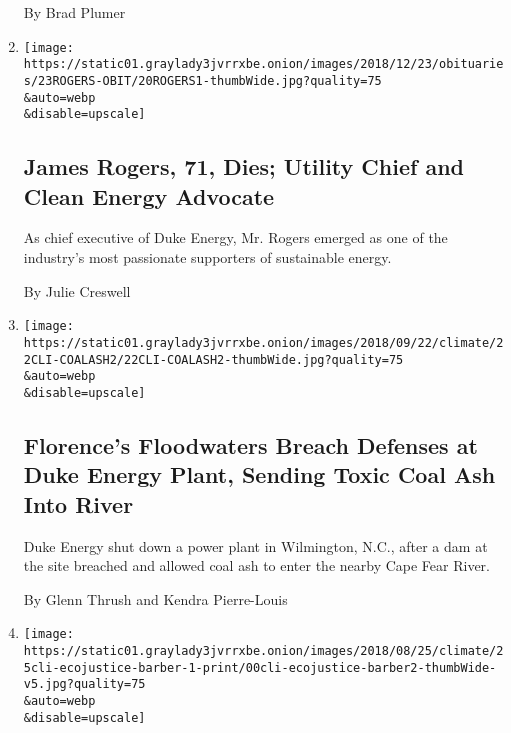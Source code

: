 \begin{enumerate}
  By Brad Plumer
\item
  \href{/2018/12/21/obituaries/james-rogers-dead.html}{}

  \texttt{[image: https://static01.graylady3jvrrxbe.onion/images/2018/12/23/obituaries/23ROGERS-OBIT/20ROGERS1-thumbWide.jpg?quality=75\\\&auto=webp\\\&disable=upscale]}

  \hypertarget{james-rogers-71-dies-utility-chief-and-clean-energy-advocate}{%
  \subsection{James Rogers, 71, Dies; Utility Chief and Clean Energy
  Advocate}\label{james-rogers-71-dies-utility-chief-and-clean-energy-advocate}}

  As chief executive of Duke Energy, Mr. Rogers emerged as one of the
  industry's most passionate supporters of sustainable energy.

  By Julie Creswell
\item
  \href{/2018/09/21/climate/florences-floodwaters-breach-defenses-at-power-plant-prompting-shutdown.html}{}

  \texttt{[image: https://static01.graylady3jvrrxbe.onion/images/2018/09/22/climate/22CLI-COALASH2/22CLI-COALASH2-thumbWide.jpg?quality=75\\\&auto=webp\\\&disable=upscale]}

  \hypertarget{florences-floodwaters-breach-defenses-at-duke-energy-plant-sending-toxic-coal-ash-into-river}{%
  \subsection{Florence's Floodwaters Breach Defenses at Duke Energy
  Plant, Sending Toxic Coal Ash Into
  River}\label{florences-floodwaters-breach-defenses-at-duke-energy-plant-sending-toxic-coal-ash-into-river}}

  Duke Energy shut down a power plant in Wilmington, N.C., after a dam
  at the site breached and allowed coal ash to enter the nearby Cape
  Fear River.

  By Glenn Thrush and Kendra Pierre-Louis
\item
  \href{/2018/08/24/climate/coal-ash-pollution-poverty.html}{}

  \texttt{[image: https://static01.graylady3jvrrxbe.onion/images/2018/08/25/climate/25cli-ecojustice-barber-1-print/00cli-ecojustice-barber2-thumbWide-v5.jpg?quality=75\\\&auto=webp\\\&disable=upscale]}

  \hypertarget{a-leader-in-the-war-on-poverty-opens-a-new-front-pollution}{%
}
\end{enumerate}
